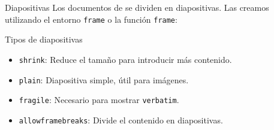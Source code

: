 \begin{frame}{Diapositivas}
  Los documentos de \beamer se dividen en diapositivas. Las creamos utilizando
  el entorno \texttt{frame} o la función \texttt{frame}:


  \pause
  \begin{block}{Tipos de diapositivas}
    \begin{itemize}
      \item \texttt{shrink}:  Reduce el tamaño para introducir más contenido.
      \item \texttt{plain}:   Diapositiva simple, útil para imágenes.
      \item \texttt{fragile}: Necesario para mostrar \texttt{verbatim}.
      \item \texttt{allowframebreaks}: Divide el contenido en diapositivas.
    \end{itemize}
  \end{block}
\end{frame}
